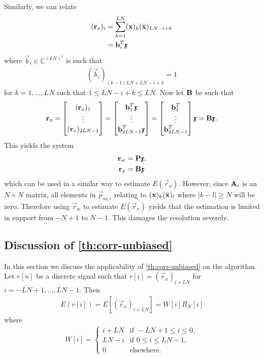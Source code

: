 \documentclass[a4paper, openany, oneside]{memoir}
\begin{document}
Similarly, we can relate
\begin{align*}
    (\boldsymbol{\mathbf{r}}_x)_i &= \sum_{k=1}^{LN}(\boldsymbol{\mathbf{x}})_k (\bar{\boldsymbol{\mathbf{x}}})_{LN-i+k} \\
    &= \boldsymbol{\mathbf{b}}_i^T \boldsymbol{\mathbf{\mathfrak{x}}}
\end{align*}
where $\vec{b}_i \in \mathbb{C}^{(LN)^2}$ is such that
\begin{align*}
    (\vec{b}_i)_{(k-1)LN+LN-i+k} = 1
\end{align*}
for $k = 1,\ldots,LN$ such that $1 \le LN-i+k \le LN$. Now let $\boldsymbol{\mathbf{B}}$ be such that
\begin{align*}
    \boldsymbol{\mathbf{r}}_x = \begin{bmatrix}
        (\boldsymbol{\mathbf{r}}_x)_1 \\
        \vdots \\
        (\boldsymbol{\mathbf{r}}_x)_{2LN-1}
    \end{bmatrix} = \begin{bmatrix}
        \boldsymbol{\mathbf{b}}_1^T \boldsymbol{\mathbf{\mathfrak{x}}} \\
        \vdots \\
        \boldsymbol{\mathbf{b}}_{2LN-1}^T \boldsymbol{\mathbf{\mathfrak{x}}}
    \end{bmatrix} = \begin{bmatrix}
        \boldsymbol{\mathbf{b}}_1^T \\
        \vdots \\
        \boldsymbol{\mathbf{b}}_{2LN-1}^T
    \end{bmatrix} \boldsymbol{\mathbf{\mathfrak{x}}} = \boldsymbol{\mathbf{B}} \boldsymbol{\mathbf{\mathfrak{x}}}.
\end{align*}
This yields the system
\begin{align*}
    \boldsymbol{\mathbf{r}}_w &= \boldsymbol{\mathbf{P}} \boldsymbol{\mathbf{\mathfrak{x}}}, \\
    \boldsymbol{\mathbf{r}}_x &= \boldsymbol{\mathbf{B}} \boldsymbol{\mathbf{\mathfrak{x}}}
\end{align*}
which can be used in a similar way to estimate $E(\vec{r}_x)$. However, since $\boldsymbol{\mathbf{A}}_i$ is an $N \times N$ matrix, all elements in $\vec{p}_{m,i}$ relating to $(\boldsymbol{\mathbf{x}})_k (\bar{\boldsymbol{\mathbf{x}}})_l$ where $|k - l| \ge N$ will be zero. Therefore using $\vec{r}_w$ to estimate $E(\vec{r}_x)$ yields that the estimation is limited in support from $-N+1$ to $N-1$. This damages the resolution severely.

\subsection{Discussion of \cref{th:corr-unbiased}}
In this section we discuss the applicability of \cref{th:corr-unbiased} on the algorithm. Let $r[n]$ be a discrete signal such that $r[i] = (\vec{r}_x)_{i+LN}$ for $i = -LN+1,\ldots,LN-1$. Then
\begin{align*}
    E(r[i])=E[(\vec{r}_x)_{i + LN}]=W[i]R_X[i]
\end{align*}
where
\begin{align*}
    W[i] = \begin{cases}
        i+LN  &\text{if } -LN+1 \le i \le 0, \\
        LN-i&\text{if } 0 \le i \le LN-1, \\
        0 & \text{elsewhere.}
    \end{cases}
\end{align*}
\end{document}
